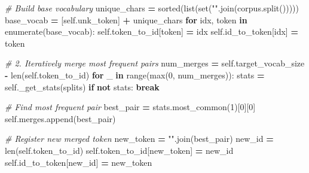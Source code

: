 \documentclass[
  letterpaper,
]{scrbook}
\newenvironment{Shaded}{\begin{snugshade}}{\end{snugshade}}
\newcommand{\BuiltInTok}[1]{#1}
\newcommand{\CommentTok}[1]{\textcolor[rgb]{0.56,0.35,0.01}{\textit{#1}}}
\newcommand{\ControlFlowTok}[1]{\textcolor[rgb]{0.13,0.29,0.53}{\textbf{#1}}}
\newcommand{\DecValTok}[1]{\textcolor[rgb]{0.00,0.00,0.81}{#1}}
\newcommand{\KeywordTok}[1]{\textcolor[rgb]{0.13,0.29,0.53}{\textbf{#1}}}
\newcommand{\NormalTok}[1]{#1}
\newcommand{\OperatorTok}[1]{\textcolor[rgb]{0.81,0.36,0.00}{\textbf{#1}}}
\newcommand{\StringTok}[1]{\textcolor[rgb]{0.31,0.60,0.02}{#1}}
\newcommand{\VariableTok}[1]{\textcolor[rgb]{0.00,0.00,0.00}{#1}}
\begin{document}
\begin{Shaded}
\begin{Highlighting}[]
        \CommentTok{\# Build base vocabulary}
\NormalTok{        unique\_chars }\OperatorTok{=} \BuiltInTok{sorted}\NormalTok{(}\BuiltInTok{list}\NormalTok{(}\BuiltInTok{set}\NormalTok{(}\StringTok{""}\NormalTok{.join(corpus.split()))))}
\NormalTok{        base\_vocab }\OperatorTok{=}\NormalTok{ [}\VariableTok{self}\NormalTok{.unk\_token] }\OperatorTok{+}\NormalTok{ unique\_chars}
        \ControlFlowTok{for}\NormalTok{ idx, token }\KeywordTok{in} \BuiltInTok{enumerate}\NormalTok{(base\_vocab):}
            \VariableTok{self}\NormalTok{.token\_to\_id[token] }\OperatorTok{=}\NormalTok{ idx}
            \VariableTok{self}\NormalTok{.id\_to\_token[idx] }\OperatorTok{=}\NormalTok{ token}

        \CommentTok{\# 2. Iteratively merge most frequent pairs}
\NormalTok{        num\_merges }\OperatorTok{=} \VariableTok{self}\NormalTok{.target\_vocab\_size }\OperatorTok{{-}} \BuiltInTok{len}\NormalTok{(}\VariableTok{self}\NormalTok{.token\_to\_id)}
        \ControlFlowTok{for}\NormalTok{ \_ }\KeywordTok{in} \BuiltInTok{range}\NormalTok{(}\BuiltInTok{max}\NormalTok{(}\DecValTok{0}\NormalTok{, num\_merges)):}
\NormalTok{            stats }\OperatorTok{=} \VariableTok{self}\NormalTok{.\_get\_stats(splits)}
            \ControlFlowTok{if} \KeywordTok{not}\NormalTok{ stats:}
                \ControlFlowTok{break}

            \CommentTok{\# Find most frequent pair}
\NormalTok{            best\_pair }\OperatorTok{=}\NormalTok{ stats.most\_common(}\DecValTok{1}\NormalTok{)[}\DecValTok{0}\NormalTok{][}\DecValTok{0}\NormalTok{]}
            \VariableTok{self}\NormalTok{.merges.append(best\_pair)}

            \CommentTok{\# Register new merged token}
\NormalTok{            new\_token }\OperatorTok{=} \StringTok{""}\NormalTok{.join(best\_pair)}
\NormalTok{            new\_id }\OperatorTok{=} \BuiltInTok{len}\NormalTok{(}\VariableTok{self}\NormalTok{.token\_to\_id)}
            \VariableTok{self}\NormalTok{.token\_to\_id[new\_token] }\OperatorTok{=}\NormalTok{ new\_id}
            \VariableTok{self}\NormalTok{.id\_to\_token[new\_id] }\OperatorTok{=}\NormalTok{ new\_token}


\end{Highlighting}
\end{Shaded}
\end{document}
